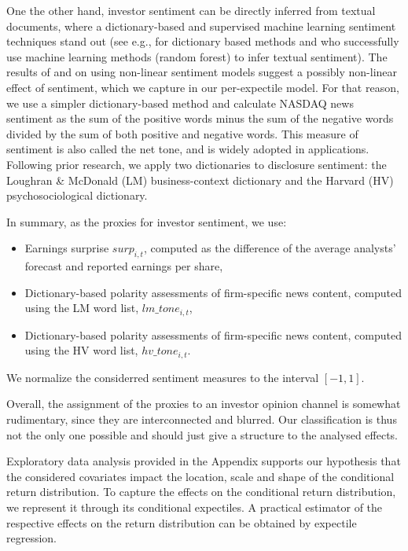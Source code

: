 \documentclass[11pt]{article}
\providecommand{\tightlist}{%
  \setlength{\itemsep}{0pt}\setlength{\parskip}{0pt}}
\begin{document}
One the other hand, investor sentiment can be directly inferred from textual documents, where a dictionary-based and supervised machine learning sentiment techniques stand out (see e.g., \cite{JEGADEESH2013} for dictionary based methods and \cite{FANG2021} who successfully use machine learning methods (random forest) to infer textual sentiment). The results of \cite{FANG2021} and \cite{FRANKEL2022} on using non-linear sentiment models suggest a possibly non-linear effect of sentiment, which we capture in our per-expectile model. For that reason, we use a simpler dictionary-based method and calculate NASDAQ news sentiment as the sum of the positive words minus the sum of the negative words divided by the sum of both positive and negative words. This measure of sentiment is also called the net tone, and is widely adopted in applications. Following prior research, we apply two dictionaries to disclosure sentiment: the Loughran \& McDonald (LM) business-context dictionary and the Harvard (HV) psychosociological dictionary.

In summary, as the proxies for investor sentiment, we use:

\begin{itemize}
\tightlist
\item
  Earnings surprise \(surp_{i,t}\), computed as the difference of the average analysts' forecast and reported earnings per share,
\item
  Dictionary-based polarity assessments of firm-specific news content, computed using the LM word list, \(lm\_tone_{i,t}\),
\item
  Dictionary-based polarity assessments of firm-specific news content, computed using the HV word list, \(hv\_tone_{i,t}\).
\end{itemize}

We normalize the considerred sentiment measures to the interval \([-1,1]\).

Overall, the assignment of the proxies to an investor opinion channel is somewhat rudimentary, since they are interconnected and blurred. Our classification is thus not the only one possible and should just give a structure to the analysed effects.

Exploratory data analysis provided in the Appendix supports our hypothesis that the considered covariates impact the location, scale and shape of the conditional return distribution. To capture the effects on the conditional return distribution, we represent it through its conditional expectiles. A practical estimator of the respective effects on the return distribution can be obtained by expectile regression.
\end{document}
